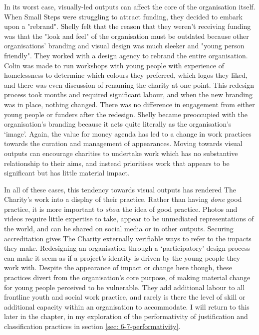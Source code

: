 In its worst case, visually-led outputs can affect the core of the organisation itself. When Small Steps were struggling to attract funding, they decided to embark upon a "rebrand". Shelly felt that the reason that they weren't receiving funding was that the "look and feel" of the organisation must be outdated because other organisations' branding and visual design was much sleeker and "young person friendly". They worked with a design agency to rebrand the entire organisation. Colin was made to run workshops with young people with experience of homelessness to determine which colours they preferred, which logos they liked, and there was even discussion of renaming the charity at one point. This redesign process took months and required significant labour, and  when the new branding was in place, nothing changed. There was no difference in engagement from either young people or funders after the redesign. Shelly became preoccupied with the organisation's branding because it acts quite literally as the organisation's `image'. Again, the value for money agenda has led to a change in work practices towards the curation and management of appearances. Moving towards visual outputs can encourage charities to undertake work which has no substantive relationship to their aims, and instead prioritises work that appears to be significant but has little material impact.

In all of these cases, this tendency towards visual outputs has rendered The Charity's work into a display of their practice. Rather than having \emph{done} good practice, it is more important to \emph{show} the idea of good practice. Photos and videos require little expertise to take, appear to be unmediated representations of the world, and can be shared on social media or in other outputs. Securing accreditation gives The Charity externally verifiable ways to refer to the impacts they make. Redesigning an organisation through a `participatory' design process can make it seem as if a project's identity is driven by the young people they work with. Despite the appearance of impact or change here though, these practices divert from the organisation's core purpose, of making material change for young people perceived to be vulnerable. They add additional labour to all frontline youth and social work practice, and rarely is there the level of skill or additional capacity within an organisation to accommodate. I will return to this later in the chapter, in my exploration of the performativity of justification and classification practices in section \ref{sec: 6-7-performativity}. 

